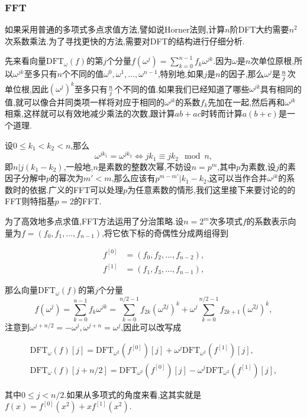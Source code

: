 \documentclass{ctexart}
\theoremstyle{remark}
\theoremstyle{definition}
\begin{document}
\subsubsection{FFT}

如果采用普通的多项式多点求值方法,譬如说Horner法则,计算$n$阶DFT大约需要$n^2$次系数乘法.为了寻找更快的方法,需要对DFT的结构进行仔细分析.

先来看向量$\mathrm{DFT}_\omega(f)$的第$j$个分量$f(\omega^j)=\sum\limits_{k=0}^{n-1}f_k\omega^{jk}$.因为$\omega$是$n$次单位原根,所以$\omega^{jk}$至多只有$n$个不同的值$\omega^0,\omega^1,\ldots,\omega^{n-1}$,特别地,如果$j$是$n$的因子,那么$\omega^j$是${n\over j}$次单位根,因此$(\omega^j)^k$至多只有${n\over j}$个不同的值.如果我们已经知道了哪些$\omega^{jk}$具有相同的值,就可以像合并同类项一样将对应于相同的$\omega^{jk}$的系数$f_k$先加在一起,然后再和$\omega^{jk}$相乘,这样就可以有效地减少乘法的次数,跟计算$ab+ac$时转而计算$a(b+c)$是一个道理.

设$0\le k_1<k_2<n$,那么$$\omega^{jk_1}=\omega^{jk_2}\Leftrightarrow jk_1\equiv jk_2\mod n,$$即$n|j(k_1-k_2)$,一般地,$n$是素数的整数次幂,不妨设$n=p^m$,其中$p$为素数,设$j$的素因子分解中$p$的幂次为$m'<m$,那么应该有$p^{m-m'}|k_1-k_2$,这可以当作合并$\omega^{jk}$的系数时的依据.广义的FFT可以处理$p$为任意素数的情形,我们这里接下来要讨论的的FFT则特指基$p=2$的FFT.

为了高效地多点求值,FFT方法运用了分治策略.设$n=2^m$次多项式$f$的系数表示向量为$f=(f_0,f_1,\ldots,f_{n-1})$,将它依下标的奇偶性分成两组得到

\begin{align*}
f^{[0]}&=(f_0,f_2,\ldots,f_{n-2}),\\
f^{[1]}&=(f_1,f_3,\ldots,f_{n-1}),
\end{align*}

那么向量$\mathrm{DFT}_\omega(f)$的第$j$个分量$$f(\omega^j)=\sum_{k=0}^{n-1}f_k\omega^{jk}=\sum_{k=0}^{n/2-1}f_{2k}(\omega^{2j})^k+\omega^j\sum_{k=0}^{n/2-1}f_{2k+1}(\omega^{2j})^k,$$注意到$\omega^{j+n/2}=-\omega^j,\omega^{j+n}=\omega^j$,因此可以改写成

\begin{align*}
\mathrm{DFT}_\omega(f)[j]=\mathrm{DFT}_{\omega^2}(f^{[0]})[j]+\omega^j\mathrm{DFT}_{\omega^2}(f^{[1]})[j],\\
\mathrm{DFT}_\omega(f)[j+n/2]=\mathrm{DFT}_{\omega^2}(f^{[0]})[j]-\omega^j\mathrm{DFT}_{\omega^2}(f^{[1]})[j],
\end{align*}

其中$0\le j<n/2$.如果从多项式的角度来看,这其实就是$f(x)=f^{[0]}(x^2)+xf^{[ 1]}(x^2)$.
\end{document}
